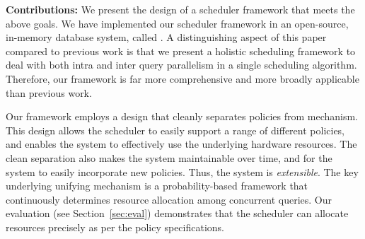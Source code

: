%
\textbf{Contributions:} We present the design of a scheduler framework that meets the above goals. 
We have implemented our scheduler framework in an open-source, in-memory database system, called \sys{}.
A distinguishing aspect of this paper compared to previous work
is that we present a holistic scheduling framework to deal with both intra and inter query parallelism in a single scheduling algorithm. 
Therefore, our framework is far more comprehensive and more broadly applicable than previous work.

Our framework employs a design that cleanly separates policies from mechanism. 
This design allows the scheduler to easily support a range of different policies, and enables the system to effectively use the underlying hardware resources. 
The clean separation also makes the system maintainable over time, and for the system to easily incorporate new policies. 
Thus, the system is \textit{extensible}. 
The key underlying unifying mechanism is a probability-based framework that continuously determines resource allocation among concurrent queries.
Our evaluation (see Section~\ref{sec:eval}) demonstrates that the scheduler can allocate resources precisely as per the policy specifications. 

